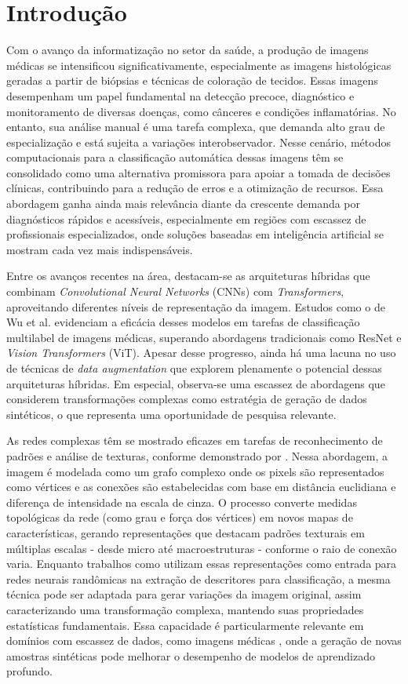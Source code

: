 \section{Introdução}

Com o avanço da informatização no setor da saúde, a produção de imagens médicas se intensificou significativamente, especialmente as imagens histológicas geradas a partir de biópsias e técnicas de coloração de tecidos. Essas imagens desempenham um papel fundamental na detecção precoce, diagnóstico e monitoramento de diversas doenças, como cânceres e condições inflamatórias. No entanto, sua análise manual é uma tarefa complexa, que demanda alto grau de especialização e está sujeita a variações interobservador. Nesse cenário, métodos computacionais para a classificação automática dessas imagens têm se consolidado como uma alternativa promissora para apoiar a tomada de decisões clínicas, contribuindo para a redução de erros e a otimização de recursos. Essa abordagem ganha ainda mais relevância diante da crescente demanda por diagnósticos rápidos e acessíveis, especialmente em regiões com escassez de profissionais especializados, onde soluções baseadas em inteligência artificial se mostram cada vez mais indispensáveis.

Entre os avanços recentes na área, destacam-se as arquiteturas híbridas que combinam \textit{Convolutional Neural Networks} (CNNs) com \textit{Transformers}, aproveitando diferentes níveis de representação da imagem. Estudos como o de Wu et al. \cite{wu2023ctranscnn} evidenciam a eficácia desses modelos em tarefas de classificação multilabel de imagens médicas, superando abordagens tradicionais como ResNet e \textit{Vision Transformers} (ViT). Apesar desse progresso, ainda há uma lacuna no uso de técnicas de \textit{data augmentation} que explorem plenamente o potencial dessas arquiteturas híbridas. Em especial, observa-se uma escassez de abordagens que considerem transformações complexas como estratégia de geração de dados sintéticos, o que representa uma oportunidade de pesquisa relevante.

As redes complexas têm se mostrado eficazes em tarefas de reconhecimento de padrões e análise de texturas, conforme demonstrado por \cite{ribas2024color}. Nessa abordagem, a imagem é modelada como um grafo complexo onde os pixels são representados como vértices e as conexões são estabelecidas com base em distância euclidiana e diferença de intensidade na escala de cinza. O processo converte medidas topológicas da rede (como grau e força dos vértices) em novos mapas de características, gerando representações que destacam padrões texturais em múltiplas escalas - desde micro até macroestruturas - conforme o raio de conexão varia. Enquanto trabalhos como \cite{ribas2024color} utilizam essas representações como entrada para redes neurais randômicas na extração de descritores para classificação, a mesma técnica pode ser adaptada para gerar variações da imagem original, assim caracterizando uma transformação complexa, mantendo suas propriedades estatísticas fundamentais. Essa capacidade é particularmente relevante em domínios com escassez de dados, como imagens médicas \cite{shorten2019survey}, onde a geração de novas amostras sintéticas pode melhorar o desempenho de modelos de aprendizado profundo.

